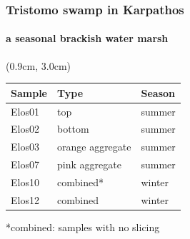 \documentclass{beamer}
\begin{document}
   \begin{frame}
      \frametitle{Tristomo swamp in Karpathos}
      \framesubtitle{a seasonal brackish water marsh}


      \begin{textblock*}{6cm}(0.9cm, 3.0cm)
         \footnotesize


         \begin{table}[]
            \begin{tabular}{lll}
            \hline
            \textbf{Sample} & \textbf{Type} & \textbf{Season} \\ \hline
            Elos01 & top & summer \\
            Elos02 & bottom & summer \\
            Elos03 & orange aggregate & summer \\
            Elos07 & pink aggregate & summer \\
            Elos10 & combined* & winter \\
            Elos12 & combined & winter
            \end{tabular}
         \end{table}
         \bigskip
         *combined: samples with no slicing







\end{textblock*}
\end{frame}
\end{document}
